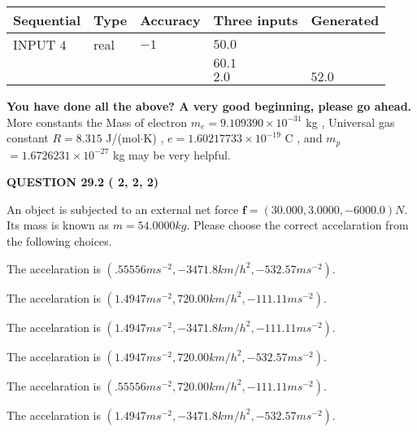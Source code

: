 \documentclass[12pt]{article}
\begin{document}
   
  
  
\noindent\begin{tabular}{|l|l|l|l|l|}
\hline
 Sequential & Type & Accuracy & Three inputs & Generated \\ 
\hline
 
 
  INPUT $           4$ & real & $          -1 $ & $
 50.0
  $ & \\
  & & &  $
 60.1
  $ & \\
  & & &  $
 2.0
 $ & $ 52.0 $ 
 \\  \hline  
 \end{tabular}
   
   
   
   
\vspace{0.3in}
{\textbf{\LARGE{You have done all the above? A very good beginning, please go ahead.}}}
More constants the
Mass of electron
$m_e$$ =
9.109390 \times 10^{-31} $
kg
,
Universal gas constant
$R$$ =
8.315 $
J/(mol$\cdot $K)
,
$e$$ =
1.60217733 \times 10^{-19} $
C
, and
$m_p$$ =
1.6726231 \times 10^{-27} $
kg
%
may be very helpful.
\vspace{0.3in}
   
   
  
\vspace{0.2in}
  
{\textbf{\Large{QUESTION
29.2 
 (          2,          2,          2)
}}}
  
  
 
An object is subjected to an external net force $\mathbf{f}=(
30.000 ,
3.0000,
-6000.0  )N$. Its mass is known as
$m= %
54.0000  kg$. Please choose the correct accelaration
from the following choices.
 
 
 
The accelaration is
$(
.55556ms^{-2},
-3471.8km/h^2,
-532.57ms^{-2}
).
$
 
 
The accelaration is
$(
1.4947ms^{-2},
720.00km/h^2,
-111.11ms^{-2}
).
$
 
 
The accelaration is
$(
1.4947ms^{-2},
-3471.8km/h^2,
-111.11ms^{-2}
).
$
 
 
The accelaration is
$(
1.4947ms^{-2},
720.00km/h^2,
-532.57ms^{-2}
).
$
 
 
The accelaration is
$(
.55556ms^{-2},
720.00km/h^2,
-111.11ms^{-2}
).
$
 
 
The accelaration is
$(
1.4947ms^{-2},
-3471.8km/h^2,
-532.57ms^{-2}
).
$
 
\end{document}
